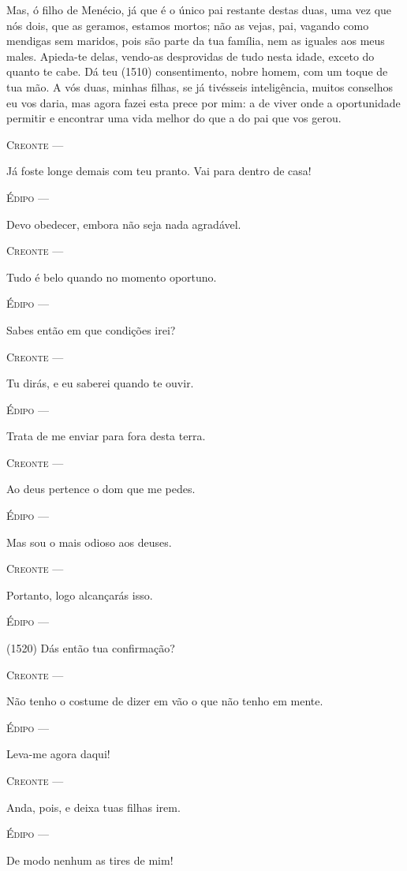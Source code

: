 Mas, ó filho de Menécio, já que é o único pai restante destas duas, uma
vez que nós dois, que as geramos, estamos mortos; não as vejas, pai,
vagando como mendigas sem maridos, pois são parte da tua família, nem as
iguales aos meus males. Apieda-te delas, vendo-as desprovidas de tudo
nesta idade, exceto do quanto te cabe. Dá teu (1510) consentimento,
nobre homem, com um toque de tua mão. A vós duas, minhas filhas, se já
tivésseis inteligência, muitos conselhos eu vos daria, mas agora fazei
esta prece por mim: a de viver onde a oportunidade permitir e encontrar
uma vida melhor do que a do pai que vos gerou.

\textsc{Creonte} ---

Já foste longe demais com teu pranto. Vai para dentro de casa!

\textsc{Édipo} ---

Devo obedecer, embora não seja nada agradável.

\textsc{Creonte} ---

Tudo é belo quando no momento oportuno.

\textsc{Édipo} ---

Sabes então em que condições irei?

\textsc{Creonte} ---

Tu dirás, e eu saberei quando te ouvir.

\textsc{Édipo} ---

Trata de me enviar para fora desta terra.

\textsc{Creonte} ---

Ao deus pertence o dom que me pedes.

\textsc{Édipo} ---

Mas sou o mais odioso aos deuses.

\textsc{Creonte} ---

Portanto, logo alcançarás isso.

\textsc{Édipo} ---

(1520) Dás então tua confirmação?

\textsc{Creonte} ---

Não tenho o costume de dizer em vão o que não tenho em mente.

\textsc{Édipo} ---

Leva-me agora daqui!

\textsc{Creonte} ---

Anda, pois, e deixa tuas filhas irem.

\textsc{Édipo} ---

De modo nenhum as tires de mim!

